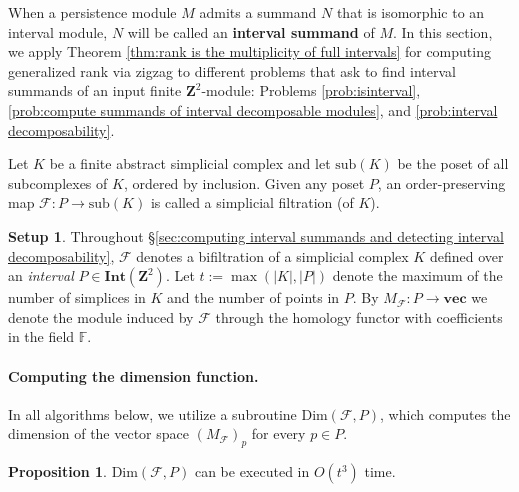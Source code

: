 \documentclass[11pt]{article}
\theoremstyle{definition}
\newtheorem{proposition}[theorem]{Proposition}
\newtheorem{setup}[]{Setup}
\newcommand{\sub}{\mathrm{sub}}
\newcommand{\Int}{\mathbf{Int}}
\newcommand{\Pb}{P}
\newcommand{\vect}{\mathbf{vec}}
\newcommand{\F}{\mathbb{F}}
\newcommand{\Fcal}{\mathcal{F}}
\newcommand{\NN}{t}
\newcommand{\Z}{\mathbf{Z}}
\begin{document}
When a persistence module $M$ admits a summand $N$ that is isomorphic to an interval module, $N$ will be called an \textbf{interval summand} of $M$. In this section, we apply Theorem \ref{thm:rank is the multiplicity of full intervals} 
for computing generalized rank via zigzag 
to different problems that ask to find interval summands of an input finite $\Z^2$-module: Problems \ref{prob:isinterval}, \ref{prob:compute summands of interval decomposable modules}, and \ref{prob:interval decomposability}. 


Let $K$ be a finite abstract simplicial complex and let $\sub(K)$ be the poset of all subcomplexes of $K$, ordered by inclusion. Given any poset $\Pb$, an order-preserving map $\Fcal:\Pb\rightarrow \sub(K)$ is called a simplicial filtration (of $K$). 


\begin{framed}
\begin{setup}\label{setup}
Throughout \S\ref{sec:computing interval summands and detecting interval decomposability},  $\mathcal F$ denotes a bifiltration of a simplicial complex $K$ defined over an \emph{interval} $\Pb\in \Int(\Z^2)$. Let $t:=\max(|K|,|P|)$ denote the maximum of the number of simplices 
in $K$ and the number of points in $\Pb$.
By $M_{\mathcal F}: \Pb\rightarrow \vect$ we denote the module induced by $\mathcal F$ through  the homology functor with coefficients in the field $\F$.
\end{setup}
\end{framed}




\paragraph{Computing the dimension function.}\label{sec:setup and dimensions}

In all algorithms below, we utilize a subroutine
{\sc Dim}$({\mathcal F},\Pb)$, which computes the dimension of the vector space $(M_{\mathcal F})_p$ for every $p\in \Pb$.
\begin{proposition}\label{prop:dimension function}
{\sc Dim}$({\mathcal F},\Pb)$ can be executed in $O(\NN^3)$ time.
\label{prop:dimension}
\end{proposition}
\end{document}
